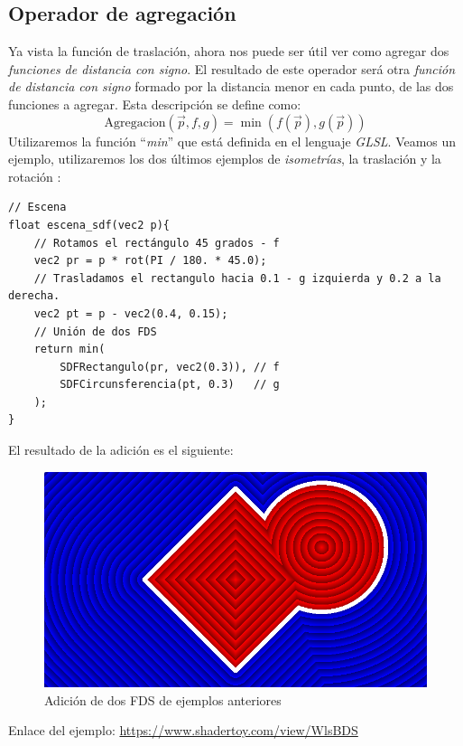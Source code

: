 \subsection{Operador de agregación}
Ya vista la función de traslación, ahora nos puede ser útil ver como agregar dos \textit{funciones de distancia con signo}. El resultado de este operador será otra \textit{función de distancia con signo} formado por la distancia menor en cada punto, de las dos funciones a agregar. Esta descripción se define como:
\[\text{Agregacion}(\Vec{p}, f, g) = \min(f(\Vec{p}), g(\Vec{p})) \]
Utilizaremos la función \enquote{\textit{min}} que está definida en el lenguaje \textit{GLSL}. Veamos un ejemplo, utilizaremos los dos últimos ejemplos de \textit{isometrías}, la traslación  y la rotación :
\begin{lstlisting}
// Escena
float escena_sdf(vec2 p){
    // Rotamos el rectángulo 45 grados - f
    vec2 pr = p * rot(PI / 180. * 45.0);
    // Trasladamos el rectangulo hacia 0.1 - g izquierda y 0.2 a la derecha.
    vec2 pt = p - vec2(0.4, 0.15);
    // Unión de dos FDS
    return min(
        SDFRectangulo(pr, vec2(0.3)), // f
        SDFCircunsferencia(pt, 0.3)   // g
    );
}
\end{lstlisting}

El resultado de la adición es el siguiente:

\begin{figure}[H]
  \centering
  \captionsetup{justification=centering}%
  \includegraphics[width=1.0\textwidth]{secciones/imagenes/sdf/2d/sdf_add.png}
  \caption{ Adición de dos FDS de ejemplos anteriores}
  \label{fig:add}
\end{figure}

Enlace del ejemplo:
\url{https://www.shadertoy.com/view/WlsBDS}

